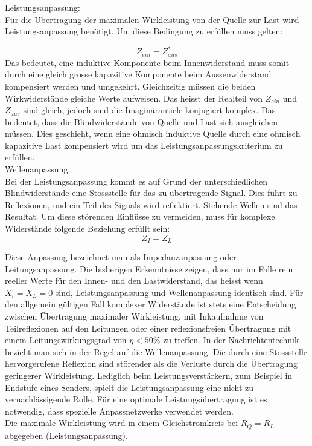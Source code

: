 Leistungsanpassung: \\
Für die Übertragung der maximalen Wirkleistung von der Quelle zur Last  wird Leistungsanpassung benötigt. Um diese Bedingung zu erfüllen muss gelten:

\[Z_{ein} = Z_{aus}^*\]
Das bedeutet, eine induktive Komponente beim Innenwiderstand muss somit durch eine gleich grosse kapazitive Komponente beim Aussenwiderstand kompensiert werden und umgekehrt. Gleichzeitig müssen die beiden Wirkwiderstände gleiche Werte aufweisen. Das heisst der Realteil von $Z_{ein}$ und $Z_{aus}$ sind gleich, jedoch sind die Imaginärantiele konjugiert komplex. Das bedeutet, dass die Blindwiderstände von Quelle und Last sich ausgleichen müssen. Dies geschieht, wenn eine ohmisch induktive Quelle durch eine ohmisch kapazitive Last kompensiert wird um das Leistungsanpassungskriterium zu erfüllen. \\

Wellenanpassung: \\
Bei der Leistungsanpassung kommt es auf Grund der unterschiedlichen Blindwiderstände 
eine Stossstelle für das zu übertragende Signal. Dies führt zu Reflexionen, und ein Teil des Signals wird reflektiert. Stehende Wellen sind das Resultat. Um diese störenden Einflüsse zu vermeiden, muss für komplexe Widerstände folgende Beziehung erfüllt sein:
\[Z_{I} = Z_{L}\]

Diese Anpassung bezeichnet man als Impedanzanpassung oder Leitungsanpassung. Die bisherigen Erkenntnisse zeigen, dass nur im Falle rein reeller Werte für den Innen- und den  Lastwiderstand, das heisst wenn $X_i = X_L = 0$ sind, Leistungsanpassung und Wellenanpassung identisch sind. Für den allgemein gültigen Fall komplexer Widerstände ist stets eine Entscheidung zwischen Übertragung maximaler Wirkleistung,  mit Inkaufnahme von Teilreflexionen auf den Leitungen oder einer reflexionsfreien Übertragung mit einem Leitungswirkungsgrad von $\eta <50 \%$ zu treffen. In der Nachrichtentechnik bezieht man sich in der Regel auf die Wellenanpassung. Die durch eine Stossstelle hervorgerufene Reflexion  sind störender als die Verluste durch die Übertragung geringerer Wirkleistung. Lediglich beim Leistungsverstärkern,  zum Beispiel in Endstufe eines Senders, spielt die Leistungsanpassung eine nicht zu vernachlässigende Rolle. Für eine optimale Leistungsübertragung ist es notwendig, dass spezielle Anpassnetzwerke verwendet werden. \\

Die maximale Wirkleistung wird in einem Gleichstromkreis bei $R_Q = R_L$ abgegeben (Leistungsanpassung).




